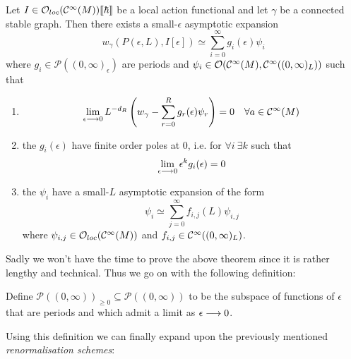 \begin{theo}
  Let $I \in \mathcal{O}_{loc}(\mathcal{C}^{\infty}(M))\llbracket \hbar \rrbracket$ be a local action functional and let $\gamma$ be a connected stable graph. Then there exists a small-$\epsilon$ asymptotic expansion
  \begin{equation}w_\gamma (P(\epsilon,L), I[\epsilon]) \simeq \sum_{i=0}^{\infty} g_i(\epsilon) \psi_i\end{equation}
  where $g_i \in \mathcal{P}((0,\infty)_\epsilon)$ are periods and $\psi_i \in \mathcal{O}(\mathcal{C}^{\infty}(M), \mathcal{C}^{\infty}((0,\infty)_L))$ such that
  \begin{enumerate}
    \item \begin{equation}\lim_{\epsilon\lra 0} L^{-d_R} \left(w_\gamma - \sum_{r=0}^R g_r(\epsilon) \psi_r \right) = 0 \quad \forall a \in \Ci(M)\end{equation}

    \item the $g_i(\epsilon)$ have finite order poles at $0$, i.e. for $\forall i \ \exists k$ such that
    \begin{equation}\lim_{\epsilon\lra 0} \epsilon^k g_i(\epsilon) = 0\end{equation}

    \item the $\psi_i$ have a small-$L$ asymptotic expansion of the form
    \begin{equation}\psi_i \simeq \sum_{j=0}^{\infty} f_{i,j} (L) \psi_{i,j}\end{equation}
    where $\psi_{i,j} \in \mathcal{O}_{loc}(\mathcal{C}^{\infty}(M))$ and $f_{i,j} \in \mathcal{C}^{\infty}((0,\infty)_L)$.
  \end{enumerate}
\end{theo}

Sadly we won't have the time to prove the above theorem since it is rather lengthy and technical. Thus we go on with the following definition:

\begin{definition}
  Define $\mathcal{P}((0,\infty))_{\geq 0} \subseteq \mathcal{P}((0,\infty))$ to be the subspace of functions of $\epsilon$ that are periods and which admit a limit as $\epsilon \lra 0$.
\end{definition}

Using this definition we can finally expand upon the previously mentioned \emph{renormalisation schemes}:


